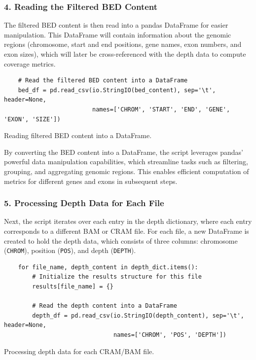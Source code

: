 \subsubsection{4. Reading the Filtered BED Content}

The filtered BED content is then read into a pandas DataFrame for easier manipulation. This DataFrame will contain information about the genomic regions (chromosome, start and end positions, gene names, exon numbers, and exon sizes), which will later be cross-referenced with the depth data to compute coverage metrics.

\begin{longlisting}
\begin{verbatim}
    # Read the filtered BED content into a DataFrame
    bed_df = pd.read_csv(io.StringIO(bed_content), sep='\t', header=None,
                         names=['CHROM', 'START', 'END', 'GENE', 'EXON', 'SIZE'])
\end{verbatim}
\caption{Reading filtered BED content into a DataFrame.}
\label{lbl:metrics_bed_df}
\end{longlisting}

By converting the BED content into a DataFrame, the script leverages pandas' powerful data manipulation capabilities, which streamline tasks such as filtering, grouping, and aggregating genomic regions. This enables efficient computation of metrics for different genes and exons in subsequent steps.

\subsubsection{5. Processing Depth Data for Each File}

Next, the script iterates over each entry in the depth dictionary, where each entry corresponds to a different BAM or CRAM file. For each file, a new DataFrame is created to hold the depth data, which consists of three columns: chromosome (\texttt{CHROM}), position (\texttt{POS}), and depth (\texttt{DEPTH}).

\begin{longlisting}
\begin{verbatim}
    for file_name, depth_content in depth_dict.items():
        # Initialize the results structure for this file
        results[file_name] = {}
        
        # Read the depth content into a DataFrame
        depth_df = pd.read_csv(io.StringIO(depth_content), sep='\t', header=None,
                               names=['CHROM', 'POS', 'DEPTH'])
\end{verbatim}
\caption{Processing depth data for each CRAM/BAM file.}
\label{lbl:metrics_depth_df}
\end{longlisting}

